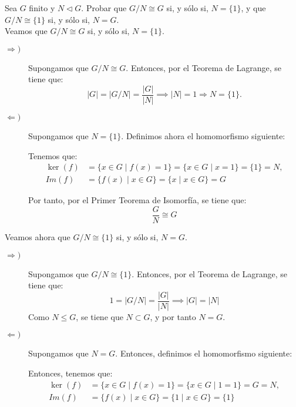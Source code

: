 \begin{ejercicio}
    Sea $G$ finito y $N\lhd G$. Probar que $G/N\cong G$ si, y sólo si, $N=\{1\}$, y que $G/N\cong \{1\}$ si, y sólo si, $N=G$.\\

    Veamos que $G/N\cong G$ si, y sólo si, $N=\{1\}$.
    \begin{description}
        \item[$\Longrightarrow)$] Supongamos que $G/N\cong G$. Entonces, por el Teorema de Lagrange, se tiene que:
        \begin{equation*}
            |G| = |G/N| = \dfrac{|G|}{|N|} \implies |N|=1\Longrightarrow N=\{1\}.
        \end{equation*}

        \item[$\Longleftarrow)$] Supongamos que $N=\{1\}$. Definimos ahora el homomorfismo siguiente:

        Tenemos que:
        \begin{align*}
            \ker(f) &= \{x\in G\mid f(x)=1\} = \{x\in G\mid x=1\} = \{1\} = N,\\
            Im(f) &= \{f(x)\mid x\in G\} = \{x\mid x\in G\} = G
        \end{align*}

        Por tanto, por el Primer Teorema de Isomorfía, se tiene que:
        \begin{equation*}
            \dfrac{G}{N}\cong G
        \end{equation*}
    \end{description}

    Veamos ahora que $G/N\cong \{1\}$ si, y sólo si, $N=G$.
    \begin{description}
        \item[$\Longrightarrow)$] Supongamos que $G/N\cong \{1\}$. Entonces, por el Teorema de Lagrange, se tiene que:
        \begin{equation*}
            1 = |G/N| = \dfrac{|G|}{|N|} \implies |G|=|N|
        \end{equation*}
        Como $N\leq G$, se tiene que $N\subset G$, y por tanto $N=G$.

        \item[$\Longleftarrow)$] Supongamos que $N=G$. Entonces, definimos el homomorfismo siguiente:

        Entonces, tenemos que:
        \begin{align*}
            \ker(f) &= \{x\in G\mid f(x)=1\} = \{x\in G\mid 1=1\} = G = N,\\
            Im(f) &= \{f(x)\mid x\in G\} = \{1\mid x\in G\} = \{1\}
        \end{align*}


\end{description}
\end{ejercicio}
